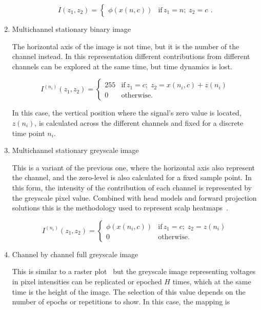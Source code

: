 \begin{enumerate}
\begin{equation}
I(z_1,z_2) = \left\{ \begin{array}{rl} \phi(x(n,c))  & \text{if} \,  z_1 = n; \; z_2 = c \end{array}\right. .
\label{eq:image3}
\end{equation}


\item Multichannel stationary binary image

The horizontal axis of the image is not time, but it is the number of the channel instead.   In this representation different contributions from different channels can be explored at the same time, but time dynamics is lost.  

\begin{equation}
I^{(n_i)}(z_1,z_2) = \left\{ \begin{array}{rl}
255 & \text{if} \,  z_1 = c; \; z_2 =  x(n_i,c) + z(n_i) \\
0   & \mbox{otherwise}.
\end{array}\right.
\label{eq:image4}
\end{equation}

In this case, the vertical position where the signal's zero value is located, $z(n_i)$, is calculated across the different channels and fixed for a discrete time point $n_i$. 

\item Multichannel stationary greyscale image

This is a variant of the previous one, where the horizontal axis also represent the channel, and the zero-level is also calculated for a fixed sample point.   In this form, the intensity of the contribution of each channel is represented by the greyscale pixel value.  Combined with head models and forward projection solutions this is the methodology used to represent scalp heatmaps~\cite{Gramfort2013}.

\begin{equation}
I^{(n_i)}(z_1,z_2)= \left\{ \begin{array}{rl}
\phi(x(n_i,c)) & \text{if} \,  z_1 = c; \; z_2 =  z(n_i) \\
0   & \mbox{otherwise}.
\end{array}\right.
\label{eq:image5}
\end{equation}


\item Channel by channel full greyscale image

This is similar to a raster plot~\cite{Cohen2014} but the greyscale image representing voltages in pixel intensities can be replicated or epoched $H$ times, which at the same time is the height of the image.  The selection of this value depends on the number of epochs or repetitions to show.  In this case, the mapping is


\end{enumerate}
